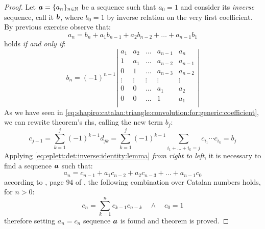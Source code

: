\begin{proof}
    Let $\boldsymbol{a}=\lbrace a_{n}\rbrace_{n\in\mathbb{N}}$ be a sequence such
    that $a_{0}=1$ and consider its \emph{inverse} sequence, call it $\boldsymbol{b}$,
    where $b_{0}=1$ by inverse relation on the very first coefficient.
    By previous exercise observe that:
    \begin{displaymath}                
        a_{n} = b_{n}+a_{1}b_{n-1}+a_{2}b_{n-2}+\ldots+a_{n-1}b_{1}
    \end{displaymath}                
    holds \emph{if and only if}:
    \begin{equation}                
        b_{n} = (-1)^{n-1}
            \left|
            \begin{array}{ccccc}
                a_1 & a_2 & \ldots & a_{n-1} & a_{n}\\
                1 & a_1 & \ldots & a_{n-2} & a_{n-1}\\
                0   & 1 & \ldots & a_{n-3} & a_{n-2}\\
                \vdots & \vdots & \vdots & \vdots & \vdots\\
                0 & 0 & \ldots & a_{1} & a_{2}\\
                0 & 0 & \ldots & 1 & a_{1}\\
            \end{array}
            \right|
        \label{eq:eplett:det:inverse:identity:lemma}
    \end{equation}                
    As we have seen in
    \autoref{eq:shapiro:catalan:triangle:convolution:for:generic:coefficient}, 
    we can rewrite theorem's \ac{rhs}, calling the new term $b_{j}$:
    \begin{displaymath}                
        c_{j-1}=\sum_{k=1}^{j}{(-1)^{k-1}d_{jk}}
            = \sum_{k=1}^{j}{(-1)^{k-1}\sum_{i_{1}+\ldots+i_{k}=j}{c_{i_{1}}\cdots c_{i_{k}}}}=b_{j}
    \end{displaymath}                
    Applying \autoref{eq:eplett:det:inverse:identity:lemma} \emph{from right to left}, 
    it is necessary to find a sequence $\boldsymbol{a}$ such that:
    \begin{displaymath}                
        a_{n} = c_{n-1}+a_{1}c_{n-2}+a_{2}c_{n-3}+\ldots+a_{n-1}c_{0}
    \end{displaymath}                
    according to \citeauthor{feller:intro:combinatorial:analysis}, page $94$ of
    \cite{feller:intro:combinatorial:analysis}, the following combination over
    Catalan numbers holds, for $n>0$:
    \begin{displaymath}                
        c_{n}=\sum_{k=1}^{n}{c_{k-1}c_{n-k}}\quad\wedge\quad c_{0}=1
    \end{displaymath}                
    therefore setting $a_{n}=c_{n}$ sequence $\boldsymbol{a}$ is found and theorem
    is proved.

\end{proof}
